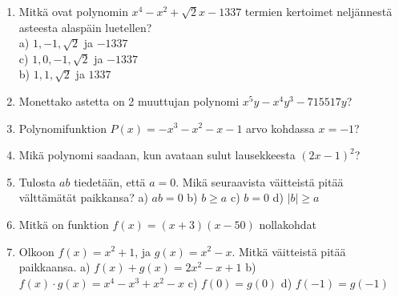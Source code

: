 \begin{enumerate}

\item Mitkä ovat polynomin $x^4-x^2+\sqrt{2}x-1337$ termien kertoimet neljännestä asteesta alaspäin luetellen? \\
a) $1, -1, \sqrt{2}$ ja $-1337$ \\
c) $1, 0, -1, \sqrt{2}$ ja $-1337$ \\
b) $1, 1, \sqrt{2}$ ja $1337$ \\


\item Monettako astetta on 2 muuttujan polynomi $x^5y-x^4y^3-715517y$?
\item Polynomifunktion $P(x)=-x^3-x^2-x-1$ arvo kohdassa $x=-1$?
\item Mikä polynomi saadaan, kun avataan sulut lausekkeesta $(2x-1)^2$?
\item Tulosta $ab$ tiedetään, että $a = 0$. Mikä seuraavista väitteistä pitää välttämätät paikkansa?
a) $ab = 0$
b) $b \geq a$
c) $b = 0$
d) $|b| \geq a$

\item Mitkä on funktion $f(x) = (x+3)(x-50)$ nollakohdat
\item Olkoon $f(x) = x^2 + 1$, ja $g(x) = x^2 - x$. Mitkä väitteistä pitää paikkaansa.
a) $f(x) + g(x) = 2x^2 - x + 1$
b) $f(x) \cdot g(x) = x^4-x^3+x^2-x$
c) $f(0) = g(0)$
d) $f(-1) = g(-1)$
\end{enumerate}

